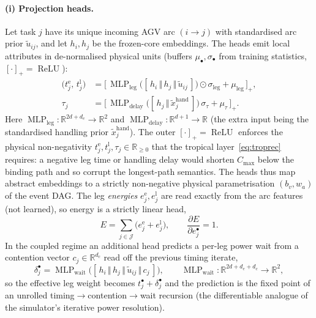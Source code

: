 \documentclass[11pt]{article}
\newcommand{\Cmax}{C_{\max}}
\newcommand{\R}{\mathbb{R}}
\DeclareMathOperator{\ReLU}{ReLU}
\DeclareMathOperator{\MLP}{MLP}
\newcommand{\concat}{\,\Vert\,}
\begin{document}
\paragraph{(i) Projection heads.} Let task $j$ have its unique incoming AGV arc $(i\!\to\!j)$
with standardised arc prior $\tilde u_{ij}$, and let $h_i,h_j$ be the frozen-core embeddings.
The heads emit local attributes in de-normalised physical units (buffers $\mu_\bullet,
\sigma_\bullet$ from training statistics, $[\cdot]_+\!=\!\ReLU$):
\begin{align}
\big(t^{\mathrm e}_j,\,t^{\mathrm l}_j\big)
&= \big[\,\MLP_{\mathrm{leg}}\!\big([\,h_i\concat h_j\concat \tilde u_{ij}\,]\big)\odot\sigma_{\mathrm{leg}}+\mu_{\mathrm{leg}}\,\big]_+,
\label{eq:leghead}\\
\tau_j &= \big[\,\MLP_{\mathrm{delay}}\!\big([\,h_j\concat \tilde x^{\mathrm{hand}}_j\,]\big)\,\sigma_\tau+\mu_\tau\,\big]_+ .
\end{align}
Here $\MLP_{\mathrm{leg}}\colon\R^{2d+d_e}\!\to\!\R^{2}$ and
$\MLP_{\mathrm{delay}}\colon\R^{d+1}\!\to\!\R$ (the extra input being the standardised
handling prior $\tilde x^{\mathrm{hand}}_j$). The outer $[\cdot]_+=\ReLU$ enforces the
physical non-negativity $t^{\mathrm e}_j,t^{\mathrm l}_j,\tau_j\in\R_{\ge0}$
that the tropical layer~\eqref{eq:troprec} requires: a negative leg time or handling delay
would shorten $\Cmax$ below the binding path and so corrupt the longest-path
semantics. The heads thus map abstract embeddings to a strictly non-negative
physical parametrisation $(b_v,w_a)$ of the event DAG. The leg \emph{energies}
$e^{\mathrm e}_j,e^{\mathrm l}_j$ are read exactly from the arc
features (not learned), so energy is a strictly linear head,
\begin{equation}
E=\sum_{j\in\mathcal J}\big(e^{\mathrm e}_j+e^{\mathrm l}_j\big),
\qquad \frac{\partial E}{\partial e^{\bullet}_j}=1 .
\label{eq:fusedenergy}
\end{equation}
In the coupled regime an additional head predicts a per-leg power wait from a contention
vector $c_j\in\R^{d_c}$ read off the previous timing iterate,
\begin{equation}
\delta^{\bullet}_j=\MLP_{\mathrm{wait}}\bigl([\,h_i\concat h_j\concat\tilde u_{ij}\concat c_j\,]\bigr),
\qquad \MLP_{\mathrm{wait}}\colon\R^{2d+d_e+d_c}\to\R^{2},
\end{equation}
so the effective leg weight becomes $t^{\bullet}_j+\delta^{\bullet}_j$ and the prediction is
the fixed point of an unrolled timing$\to$contention$\to$wait recursion (the differentiable
analogue of the simulator's iterative power resolution).
\end{document}
